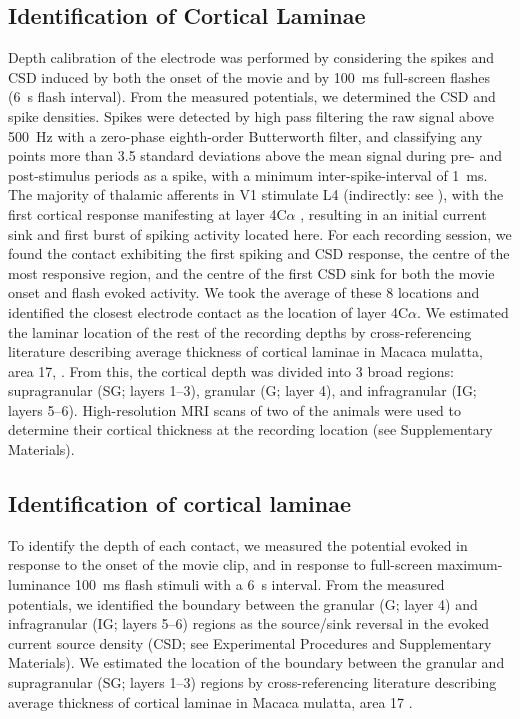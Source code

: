 \subsection{Identification of Cortical Laminae}
Depth calibration of the electrode was performed by considering the spikes and \ac{CSD} induced by both the onset of the movie and by \SI{100}{\milli\second} full-screen flashes (\SI{6}{\second} flash interval).
From the measured potentials, we determined the \ac{CSD} and spike densities.
Spikes were detected by high pass filtering the raw signal above \SI{500}{Hz} with a zero-phase eighth-order Butterworth filter, and classifying any points more than 3.5 standard deviations above the mean signal during pre- and post-stimulus periods as a spike, with a minimum inter-spike-interval of \SI{1}{\milli\second}.
The majority of thalamic afferents in \ac{V1} stimulate \ac{L4} (indirectly: see \cite{Hansen2012}), with the first cortical response manifesting at layer 4C$\alpha$ \citep{Callaway1998}, resulting in an initial current sink and first burst of spiking activity located here.
For each recording session, we found the contact exhibiting the first spiking and \ac{CSD} response, the centre of the most responsive region, and the centre of the first \ac{CSD} sink for both the movie onset and flash evoked activity.
We took the average of these 8 locations and identified the closest electrode contact as the location of layer 4C$\alpha$.
We estimated the laminar location of the rest of the recording depths by cross-referencing literature describing average thickness of cortical laminae in Macaca mulatta, area 17, \citep{Lund1973}.
From this, the cortical depth was divided into 3 broad regions: supragranular (SG; layers 1--3), granular (G; layer 4), and infragranular (IG; layers 5--6).
High-resolution \ac{MRI} scans of two of the animals were used to determine their cortical thickness at the recording location (see Supplementary Materials).

\subsection{Identification of cortical laminae}
To identify the depth of each contact, we measured the potential evoked in response to the onset of the movie clip, and in response to full-screen maximum-luminance \SI{100}{\milli\second} flash stimuli with a \SI{6}{\second} interval.
From the measured potentials, we identified the boundary between the granular (G; layer 4) and infragranular (IG; layers 5--6) regions as the source/sink reversal in the evoked current source density (\ac{CSD}; see Experimental Procedures and Supplementary Materials).
We estimated the location of the boundary between the granular and supragranular (SG; layers 1--3) regions by cross-referencing literature describing average thickness of cortical laminae in Macaca mulatta, area 17 \citep{Lund1973}.

